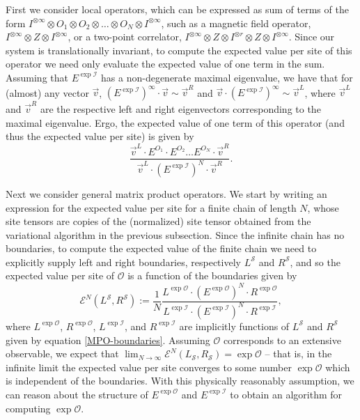 \documentclass[12pt]{amsbook}
\theoremstyle{plain}
\theoremstyle{definition}
\theoremstyle{remark}
\newcommand{\paren}[1]{\left(#1\right)}
\newcommand{\mexp}[1]{\exp{\mathcal{#1}}}
\begin{document}
First we consider local operators, which can be expressed as sum of terms of the form $I^{\otimes\infty} \otimes O_1 \otimes O_2 \otimes \dots \otimes O_N \otimes I^{\otimes\infty}$, such as a magnetic field operator, $I^{\otimes\infty} \otimes Z\otimes I^{\otimes\infty}$, or a two-point correlator, $I^{\otimes\infty}\otimes Z\otimes I^{\otimes r}\otimes Z \otimes I^{\otimes\infty}$.  Since our system is translationally invariant, to compute the expected value per site of this operator we need only evaluate the expected value of one term in the sum.  Assuming that $E^{\mexp{I}}$ has a non-degenerate maximal eigenvalue, we have that for (almost) any vector $\vec{v}$, $\paren{E^{\mexp{I}}}^\infty\cdot \vec{v} \sim \vec{v}^R$ and $\vec{v}\cdot \paren{E^{\mexp{I}}}^\infty \sim \vec{v}^L$, where $\vec{v}^L$ and $\vec{v}^R$ are the respective left and right eigenvectors corresponding to the maximal eigenvalue.  Ergo, the expected value of one term of this operator (and thus the expected value per site) is given by  $$\frac{\vec{v}^L\cdot E^{O_1}\cdot E^{O_2}\dots E^{O_N}\cdot \vec{v}^R}{\vec{v}^L\cdot \paren{E^{\mexp{I}}}^N \cdot \vec{v}^R}.$$

Next we consider general matrix product operators.  We start by writing an expression for the expected value per site for a finite chain of length $N$, whose site tensors are copies of the (normalized) site tensor obtained from the variational algorithm in the previous subsection.  Since the infinite chain has no boundaries, to compute the expected value of the finite chain we need to explicitly supply left and right boundaries, respectively $L^{\mathcal{S}}$ and $R^{\mathcal{S}}$, and so the expected value per site of $\mathcal{O}$ is a function of the boundaries given by $$\mathcal{E}^N(L^{\mathcal{S}},R^{\mathcal{S}}):=\frac{1}{N}\frac{L^{\mexp{O}} \cdot \paren{E^{\mexp{O}}}^N \cdot R^{\mexp{O}}}{L^{\mexp{I}} \cdot \paren{E^{\mexp{I}}}^N \cdot R^{\mexp{I}}},$$  where $L^{\mexp{O}}$, $R^{\mexp{O}}$, $L^{\mexp{I}}$, and $R^{\mexp{I}}$ are implicitly functions of $L^{\mathcal{S}}$ and $R^{\mathcal{S}}$ given by equation \eqref{MPO-boundaries}.  Assuming $\mathcal{O}$ corresponds to an extensive observable, we expect that $\lim_{N\to\infty} \mathcal{E}^N(L_{\mathcal{S}},R_{\mathcal{S}}) = \mexp{O}$ -- that is, in the infinite limit the expected value per site converges to some number $\mexp{O}$ which is independent of the boundaries.  With this physically reasonably assumption, we can reason about the structure of $E^{\mexp{O}}$ and $E^{\mexp{I}}$ to obtain an algorithm for computing $\mexp{O}$.
\end{document}
